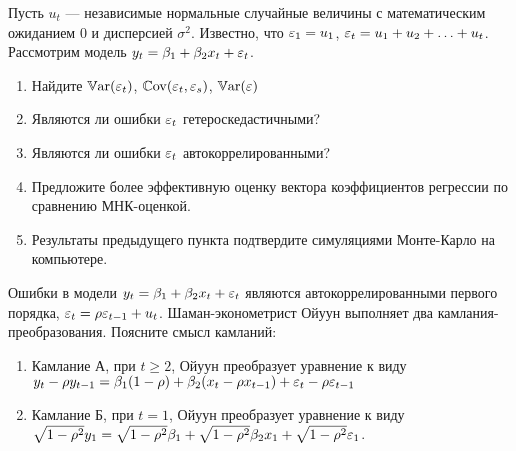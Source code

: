 \begin{problem}
Пусть $u_t$ — независимые нормальные случайные величины с
математическим ожиданием $0$ и дисперсией $\sigma^2$. Известно, что $\varepsilon_1=u_1$, $\varepsilon_t=u_1+u_2+\ldots+u_t$. 
Рассмотрим модель $y_t=\beta_1+\beta_2 x_t + \varepsilon_t$.

\begin{enumerate}
\item Найдите $\operatorname{\mathbb{V}\mathrm{ar}}(\varepsilon_t)$, $\operatorname{\mathbb{C}\mathrm{ov}}(\varepsilon_t,\varepsilon_s)$, $\operatorname{\mathbb{V}\mathrm{ar}}(\varepsilon)$
\item Являются ли ошибки $\varepsilon_t$ гетероскедастичными?
\item Являются ли ошибки $\varepsilon_t$ автокоррелированными?
\item Предложите более эффективную оценку вектора коэффициентов регрессии по сравнению МНК-оценкой.
\item Результаты предыдущего пункта подтвердите симуляциями Монте-Карло на компьютере.
\end{enumerate}

\begin{sol}
\end{sol}
\end{problem}


\begin{problem}
Ошибки в модели $y_t=\beta_1+\beta_2 x_{t}+\varepsilon_t$ являются автокоррелированными первого порядка, $\varepsilon_t=\rho \varepsilon_{t-1}+u_t$. Шаман-эконометрист Ойуун выполняет два камлания-преобразования. Поясните смысл камланий:
\begin{enumerate}
\item Камлание А, при $t\geq 2$, Ойуун преобразует уравнение к виду $y_t-\rho y_{t-1}=\beta_1(1-\rho)+ \beta_2(x_t-\rho x_{t-1})+\varepsilon_t-\rho \varepsilon_{t-1}$
\item Камлание Б, при $t=1$, Ойуун преобразует уравнение к виду $\sqrt{1-\rho^2}y_1=\sqrt{1-\rho^2}\beta_1+\sqrt{1-\rho^2}\beta_2 x_1+\sqrt{1-\rho^2}\varepsilon_1$.
\end{enumerate}

\begin{sol}
\end{sol}
\end{problem}


